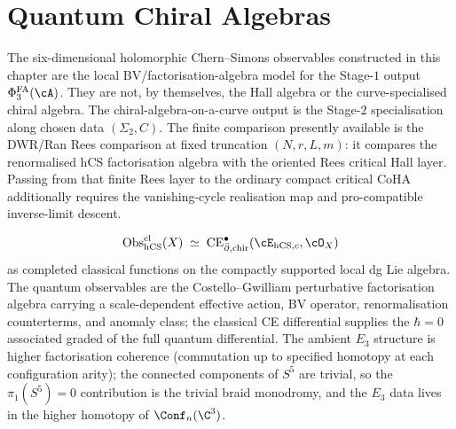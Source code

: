 \label{def:shadow-class}%
\label{def:shadow-invariants}%
\providecommand{\Br}{\mathrm{Br}}%
\providecommand{\Drinfdouble}[1]{D(#1)}%
\providecommand{\PhiFA}{\Phi^{\mathrm{FA}}}%
\providecommand{\hCS}{\mathrm{hCS}}%
\providecommand{\Wonepinf}{\mathcal{W}_{1+\infty}}%
\providecommand{\protectedPfaff}[1]{\mathrm{Pf}^{\mathrm{prot}}(#1)}%

\chapter{Quantum Chiral Algebras}
\label{ch:quantum-chiral-algebras}

\begin{remark}
\label{rem:qca-two-stage-locus}
The six-dimensional holomorphic Chern--Simons observables constructed in
this chapter are the local BV/factorisation-algebra model for the
Stage-$1$ output $\Phi^{\mathrm{FA}}_3(\cA)$. They are not, by
themselves, the Hall algebra or the curve-specialised chiral algebra.
The chiral-algebra-on-a-curve output is the Stage-$2$ specialisation
along chosen data $(\Sigma_2, C)$.  The finite comparison presently
available is the DWR/Ran Rees comparison at fixed truncation
$(N,r,L,m)$: it compares the renormalised hCS factorisation algebra with
the oriented Rees critical Hall layer.  Passing from that finite Rees
layer to the ordinary compact critical CoHA additionally requires the
vanishing-cycle realisation map and pro-compatible inverse-limit descent.
\end{remark}

\begin{theorem}
\label{thm:hcs-obs-e3-ce-dolbeault}
\[
 \mathrm{Obs}^{\mathrm{cl}}_{\mathrm{hCS}}(X) \;\simeq\; \mathrm{CE}^\bullet_{\bar\partial, \mathrm{chir}}(\cE_{\mathrm{hCS},c}, \cO_X)
\]
as completed classical functions on the compactly supported local dg Lie
algebra. The quantum observables are the Costello--Gwilliam
perturbative factorisation algebra carrying a scale-dependent
effective action, BV operator, renormalisation counterterms, and
anomaly class; the classical CE differential supplies the
$\hbar = 0$ associated graded of the full quantum differential. The
ambient $E_3$ structure is higher factorisation coherence
(commutation up to specified homotopy at each configuration arity);
the connected components of $S^5$ are trivial, so the $\pi_1(S^5) = 0$
contribution is the trivial braid monodromy, and the $E_3$ data lives
in the higher homotopy of $\Conf_n(\C^3)$.
\end{theorem}

